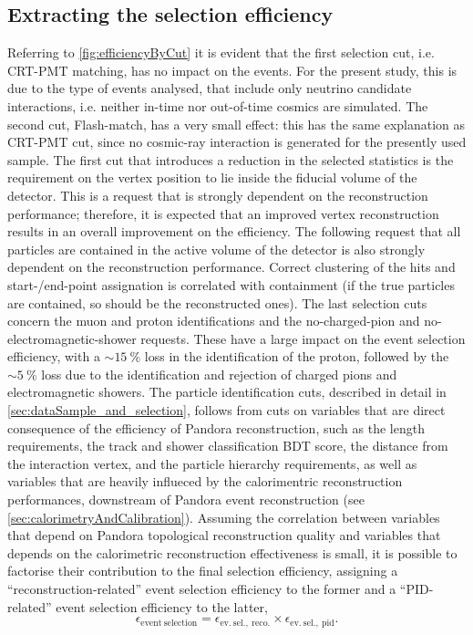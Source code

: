 
\subsection{Extracting the selection efficiency} \label{sec:efficiencyPidExtraction}

Referring to \autoref{fig:efficiencyByCut} it is evident that the first selection cut, i.e. CRT-PMT matching, has no impact on the events.
For the present study, this is due to the type of events analysed, that include only neutrino candidate interactions, i.e. neither in-time nor out-of-time cosmics are simulated.
The second cut, Flash-match, has a very small effect: this has the same explanation as CRT-PMT cut, since no cosmic-ray interaction is generated for the presently used sample.
The first cut that introduces a reduction in the selected statistics is the requirement on the vertex position to lie inside the fiducial volume of the detector.
This is a request that is strongly dependent on the reconstruction performance; therefore, it is expected that an improved vertex reconstruction results in an overall improvement on the efficiency.
The following request that all particles are contained in the active volume of the detector is also strongly dependent on the reconstruction performance. Correct clustering of the hits and start-/end-point assignation is correlated with containment (if the true particles are contained, so should be the reconstructed ones). 
The last selection cuts concern the muon and proton identifications and the no-charged-pion and no-electromagnetic-shower requests. These have a large impact on the event selection efficiency, with a ${\sim}\SI{15}{\percent}$ loss in the identification of the proton, followed by the ${\sim}\SI{5}{\percent}$ loss due to the identification and rejection of charged pions and electromagnetic showers. The particle identification cuts, described in detail in \autoref{sec:dataSample_and_selection}, follows from cuts on variables that are direct consequence of the efficiency of Pandora reconstruction, such as the length requirements, the track and shower classification BDT score, the distance from the interaction vertex, and the particle hierarchy requirements, as well as variables that are heavily influeced by the calorimentric reconstruction performances, downstream of Pandora event reconstruction (see \autoref{sec:calorimetryAndCalibration}). Assuming the correlation between variables that depend on Pandora topological reconstruction quality and variables that depends on the calorimetric reconstruction effectiveness is small, it is possible to factorise their contribution to the final selection efficiency, assigning a ``reconstruction-related'' event selection efficiency to the former and a ``PID-related'' event selection efficiency to the latter, \begin{equation}
    \epsilon_\mathrm{event\ selection} = \epsilon_\mathrm{ev.\ sel.,\ reco.} \times \epsilon_\mathrm{ev.\ sel.,\ pid}. \label{eq:originalSelEfficiency}
\end{equation} 

